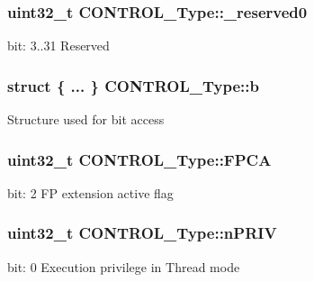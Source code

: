 \subsubsection[{\texorpdfstring{\+\_\+reserved0}{_reserved0}}]{\setlength{\rightskip}{0pt plus 5cm}uint32\+\_\+t C\+O\+N\+T\+R\+O\+L\+\_\+\+Type\+::\+\_\+reserved0}\hypertarget{union_c_o_n_t_r_o_l___type_af8c314273a1e4970a5671bd7f8184f50}{}\label{union_c_o_n_t_r_o_l___type_af8c314273a1e4970a5671bd7f8184f50}
bit\+: 3..31 Reserved 
\subsubsection[{\texorpdfstring{b}{b}}]{\setlength{\rightskip}{0pt plus 5cm}struct \{ ... \}   C\+O\+N\+T\+R\+O\+L\+\_\+\+Type\+::b}\hypertarget{union_c_o_n_t_r_o_l___type_adc6a38ab2980d0e9577b5a871da14eb9}{}\label{union_c_o_n_t_r_o_l___type_adc6a38ab2980d0e9577b5a871da14eb9}
Structure used for bit access 
\subsubsection[{\texorpdfstring{F\+P\+CA}{FPCA}}]{\setlength{\rightskip}{0pt plus 5cm}uint32\+\_\+t C\+O\+N\+T\+R\+O\+L\+\_\+\+Type\+::\+F\+P\+CA}\hypertarget{union_c_o_n_t_r_o_l___type_ac62cfff08e6f055e0101785bad7094cd}{}\label{union_c_o_n_t_r_o_l___type_ac62cfff08e6f055e0101785bad7094cd}
bit\+: 2 FP extension active flag 
\subsubsection[{\texorpdfstring{n\+P\+R\+IV}{nPRIV}}]{\setlength{\rightskip}{0pt plus 5cm}uint32\+\_\+t C\+O\+N\+T\+R\+O\+L\+\_\+\+Type\+::n\+P\+R\+IV}\hypertarget{union_c_o_n_t_r_o_l___type_a35c1732cf153b7b5c4bd321cf1de9605}{}\label{union_c_o_n_t_r_o_l___type_a35c1732cf153b7b5c4bd321cf1de9605}
bit\+: 0 Execution privilege in Thread mode 
